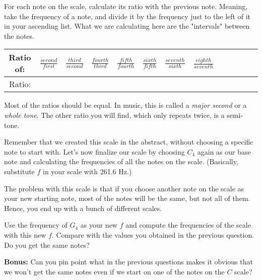 \documentclass[12pt,noauthor,nooutcomes,hints,instructornotes]{ximera}%
\begin{document}
\begin{question} For each note on the scale, calculate its ratio with the previous note. Meaning, take the frequency of a note, and divide it by the frequency just to the left of it in your ascending list. What we are calculating here are the "intervals" between the notes.
\begin{center}
\renewcommand{\arraystretch}{3}
\begin{tabular}{|c|c|c|c|c|c|c|c|c|c|c|c|c|}\hline
\footnotesize{Ratio of:} & $\frac{second}{first}$ & $\frac{third}{second}$ & $\frac{fourth}{third}$ & $\frac{fifth}{fourth}$ & $\frac{sixth}{fifth}$ & $\frac{seventh}{sixth}$ & $\frac{eighth}{seventh}$    \\\hline
Ratio: & &&&&&&  \\\hline
\end{tabular}
\end{center}
    \begin{hint} Most of the ratios should be equal. In music, this is called a \textit{major second} or a \textit{whole tone}. The other ratio you will find, which only repeats twice, is a semi-tone.   \end{hint}
\end{question}     
    
\begin{question}Remember that we created this scale in the abstract, without choosing a specific note to start with. Let's now finalize our scale by choosing $C_4$ again as our base note and calculating the frequencies of all the notes on the scale. (Basically, substitute $f$ in your scale with 261.6 Hz.)\end{question} 
    
 The problem with this scale is that if you choose another note on the scale as your new starting note, most of the notes will be the same, but not all of them. Hence, you end up with a bunch of different scales. 
 
\begin{question}  Use the frequency of $G_4$ as your new $f$ and compute the frequencies of the scale with this new $f$. Compare with the values you obtained in the previous question. Do you get the same notes?\end{question} 
 
\textbf{Bonus:} Can you pin point what in the previous questions makes it obvious that we won't get the same notes even if we start on one of the notes on the $C$ scale?
 
\end{document}
